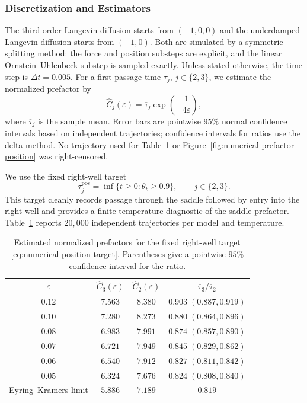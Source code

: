 \documentclass[11pt]{article}
\numberwithin{equation}{section}
\theoremstyle{plain}
\theoremstyle{definition}
\theoremstyle{remark}
\newcommand{\eps}{\varepsilon}
\begin{document}
\subsubsection{Discretization and Estimators}

The third-order Langevin diffusion starts from $(-1,0,0)$ and the underdamped
Langevin diffusion starts from $(-1,0)$.  Both are simulated by a symmetric
splitting method: the force and position substeps are explicit, and the linear
Ornstein--Uhlenbeck substep is sampled exactly.  Unless stated otherwise, the
time step is $\Delta t=0.005$.  For a first-passage time $\tau_j$, $j\in
\{2,3\}$, we estimate the normalized prefactor by
\begin{equation}
\label{eq:numerical-prefactor-estimator}
\widehat C_j(\eps)
=\overline\tau_j\exp\!\left(-\frac{1}{4\eps}\right),
\end{equation}
where $\overline\tau_j$ is the sample mean.  Error bars are pointwise $95\%$
normal confidence intervals based on independent trajectories; confidence
intervals for ratios use the delta method.  No trajectory used for
Table~\ref{tab:numerical-position} or
Figure~\ref{fig:numerical-prefactor-position} was right-censored.

We use the fixed right-well target
\begin{equation}
\label{eq:numerical-position-target}
\tau_j^{\mathrm{pos}}
=\inf\{t\geq0:\theta_t\geq0.9\},
\qquad j\in\{2,3\}.
\end{equation}
This target cleanly records passage through the saddle followed by entry into
the right well and provides a finite-temperature diagnostic of the saddle
prefactor.  Table~\ref{tab:numerical-position} reports $20{,}000$
independent trajectories per model and temperature.

\begin{table}[b]
\centering
\caption{Estimated normalized prefactors for the fixed right-well target
\eqref{eq:numerical-position-target}.  Parentheses give a pointwise $95\%$
confidence interval for the ratio.}
\label{tab:numerical-position}
\begin{tabular}{cccc}
\toprule
$\eps$ & $\widehat C_3(\eps)$ & $\widehat C_2(\eps)$
& $\overline\tau_3/\overline\tau_2$ \\
\midrule
$0.12$ & $7.563$ & $8.380$ & $0.903\;(0.887,0.919)$ \\
$0.10$ & $7.280$ & $8.273$ & $0.880\;(0.864,0.896)$ \\
$0.08$ & $6.983$ & $7.991$ & $0.874\;(0.857,0.890)$ \\
$0.07$ & $6.721$ & $7.949$ & $0.845\;(0.829,0.862)$ \\
$0.06$ & $6.540$ & $7.912$ & $0.827\;(0.811,0.842)$ \\
$0.05$ & $6.324$ & $7.676$ & $0.824\;(0.808,0.840)$ \\
\midrule
Eyring--Kramers limit & $5.886$ & $7.189$ & $0.819$ \\
\bottomrule
\end{tabular}
\end{table}
\end{document}

